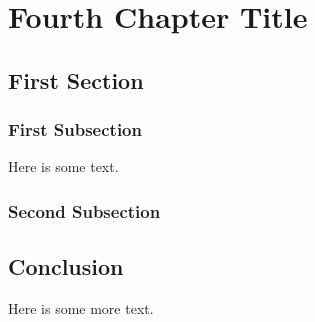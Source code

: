 \chapter{Fourth Chapter Title}
\chaptoc %

\section{First Section}
\subsection{First Subsection}
Here is some text. 

\subsection{Second Subsection}

\section{Conclusion}
Here is some more text. 
